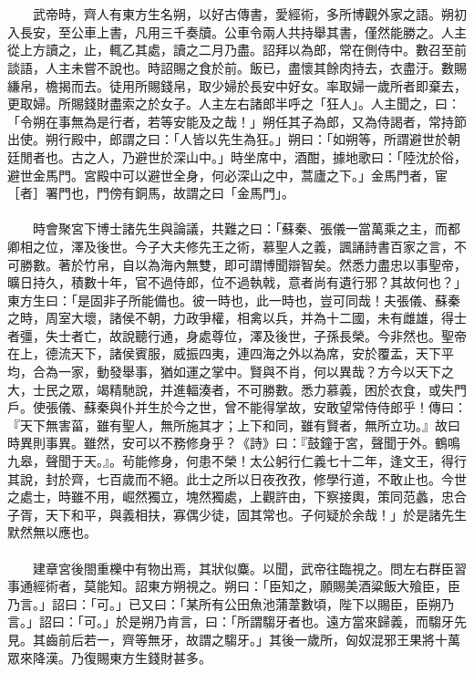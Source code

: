 \\\\
　　武帝時，齊人有東方生名朔，以好古傳書，愛經術，多所博觀外家之語。朔初入長安，至公車上書，凡用三千奏牘。公車令兩人共持舉其書，僅然能勝之。人主從上方讀之，止，輒乙其處，讀之二月乃盡。詔拜以為郎，常在側侍中。數召至前談語，人主未嘗不說也。時詔賜之食於前。飯已，盡懷其餘肉持去，衣盡汙。數賜縑帛，檐揭而去。徒用所賜錢帛，取少婦於長安中好女。率取婦一歲所者即棄去，更取婦。所賜錢財盡索之於女子。人主左右諸郎半呼之「狂人」。人主聞之，曰：「令朔在事無為是行者，若等安能及之哉！」朔任其子為郎，又為侍謁者，常持節出使。朔行殿中，郎謂之曰：「人皆以先生為狂。」朔曰：「如朔等，所謂避世於朝廷閒者也。古之人，乃避世於深山中。」時坐席中，酒酣，據地歌曰：「陸沈於俗，避世金馬門。宮殿中可以避世全身，何必深山之中，蒿廬之下。」金馬門者，宦［者］署門也，門傍有銅馬，故謂之曰「金馬門」。
\\\\
　　時會聚宮下博士諸先生與論議，共難之曰：「蘇秦、張儀一當萬乘之主，而都卿相之位，澤及後世。今子大夫修先王之術，慕聖人之義，諷誦詩書百家之言，不可勝數。著於竹帛，自以為海內無雙，即可謂博聞辯智矣。然悉力盡忠以事聖帝，曠日持久，積數十年，官不過侍郎，位不過執戟，意者尚有遺行邪？其故何也？」東方生曰：「是固非子所能備也。彼一時也，此一時也，豈可同哉！夫張儀、蘇秦之時，周室大壞，諸侯不朝，力政爭權，相禽以兵，并為十二國，未有雌雄，得士者彊，失士者亡，故說聽行通，身處尊位，澤及後世，子孫長榮。今非然也。聖帝在上，德流天下，諸侯賓服，威振四夷，連四海之外以為席，安於覆盂，天下平均，合為一家，動發舉事，猶如運之掌中。賢與不肖，何以異哉？方今以天下之大，士民之眾，竭精馳說，并進輻湊者，不可勝數。悉力慕義，困於衣食，或失門戶。使張儀、蘇秦與仆并生於今之世，曾不能得掌故，安敢望常侍侍郎乎！傳曰：『天下無害菑，雖有聖人，無所施其才；上下和同，雖有賢者，無所立功。』故曰時異則事異。雖然，安可以不務修身乎？《詩》曰：『鼓鐘于宮，聲聞于外。鶴鳴九皋，聲聞于天。』。茍能修身，何患不榮！太公躬行仁義七十二年，逢文王，得行其說，封於齊，七百歲而不絕。此士之所以日夜孜孜，修學行道，不敢止也。今世之處士，時雖不用，崛然獨立，塊然獨處，上觀許由，下察接輿，策同范蠡，忠合子胥，天下和平，與義相扶，寡偶少徒，固其常也。子何疑於余哉！」於是諸先生默然無以應也。
\\\\
　　建章宮後閤重櫟中有物出焉，其狀似麋。以聞，武帝往臨視之。問左右群臣習事通經術者，莫能知。詔東方朔視之。朔曰：「臣知之，願賜美酒粱飯大飱臣，臣乃言。」詔曰：「可。」已又曰：「某所有公田魚池蒲葦數頃，陛下以賜臣，臣朔乃言。」詔曰：「可。」於是朔乃肯言，曰：「所謂騶牙者也。遠方當來歸義，而騶牙先見。其齒前后若一，齊等無牙，故謂之騶牙。」其後一歲所，匈奴混邪王果將十萬眾來降漢。乃復賜東方生錢財甚多。
